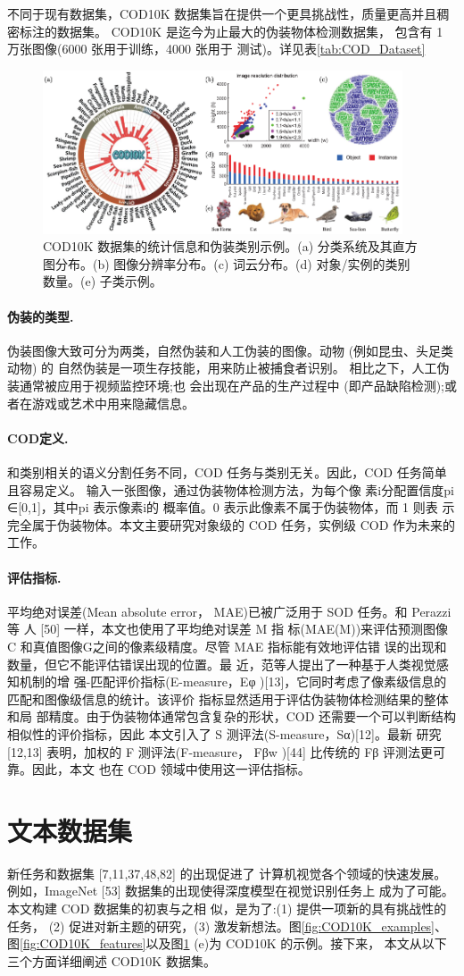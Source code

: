 \documentclass[final]{cvpr}
\newcommand{\mypara}[1]{\paragraph{#1.}}
\renewcommand{\figref}[1]{图\ref{#1}}
\renewcommand{\tabref}[1]{表\ref{#1}}
\begin{document}
不同于现有数据集，COD10K 数据集旨在提供一个更具挑战性，质量更高并且稠密标注的数据集。 COD10K 是迄今为止最大的伪装物体检测数据集， 包含有 1 万张图像(6000 张用于训练，4000 张用于 测试)。详见\tabref{tab:COD_Dataset}
\begin{figure}
    \centering
    \includegraphics[width=0.95\textwidth]{COD_Zh_translate/figures/Catagory_COD10k.png}\small
    \caption{COD10K 数据集的统计信息和伪装类别示例。(a) 分类系统及其直方图分布。(b) 图像分辨率分布。(c) 词云分布。(d) 对象/实例的类别数量。(e) 子类示例。}
    \label{fig:Catagory_COD10k}
\end{figure}
\mypara{伪装的类型}伪装图像大致可分为两类，自然伪装和人工伪装的图像。动物 (例如昆虫、头足类动物) 的 自然伪装是一项生存技能，用来防止被捕食者识别。 相比之下，人工伪装通常被应用于视频监控环境;也 会出现在产品的生产过程中 (即产品缺陷检测);或 者在游戏或艺术中用来隐藏信息。
\mypara{COD定义} 和类别相关的语义分割任务不同，COD 任务与类别无关。因此，COD 任务简单且容易定义。 输入一张图像，通过伪装物体检测方法，为每个像 素i分配置信度pi ∈[0,1]，其中pi 表示像素i的 概率值。0 表示此像素不属于伪装物体，而 1 则表 示完全属于伪装物体。本文主要研究对象级的 COD 任务，实例级 COD 作为未来的工作。
\mypara{评估指标}平均绝对误差(Mean absolute error， MAE)已被广泛用于 SOD 任务。和 Perazzi 等 人 [50] 一样，本文也使用了平均绝对误差 M 指 标(MAE(M))来评估预测图像 C 和真值图像G之间的像素级精度。尽管 MAE 指标能有效地评估错 误的出现和数量，但它不能评估错误出现的位置。最 近，范等人提出了一种基于人类视觉感知机制的增 强-匹配评价指标(E-measure，Eφ )[13]，它同时考虑了像素级信息的匹配和图像级信息的统计。该评价 指标显然适用于评估伪装物体检测结果的整体和局 部精度。由于伪装物体通常包含复杂的形状，COD 还需要一个可以判断结构相似性的评价指标，因此 本文引入了 S 测评法(S-measure，Sα)[12]。最新 研究 [12,13] 表明，加权的 F 测评法(F-measure， Fβw )[44] 比传统的 Fβ 评测法更可靠。因此，本文 也在 COD 领域中使用这一评估指标。
\section{文本数据集}\label{sec:HC}
新任务和数据集 [7,11,37,48,82] 的出现促进了 计算机视觉各个领域的快速发展。例如，ImageNet [53] 数据集的出现使得深度模型在视觉识别任务上 成为了可能。本文构建 COD 数据集的初衷与之相 似，是为了:(1) 提供一项新的具有挑战性的任务， (2) 促进对新主题的研究，(3) 激发新想法。\figref{fig:COD10K_examples}、\figref{fig:COD10K_features}以及\figref{fig:Catagory_COD10k} (e)为 COD10K 的示例。接下来， 本文从以下三个方面详细阐述 COD10K 数据集。
\end{document}
